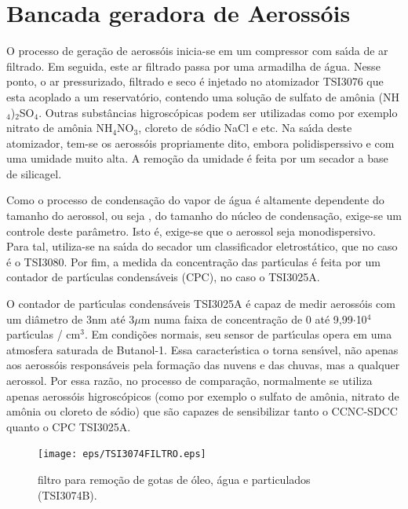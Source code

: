 \doublespacing
\chapter{Bancada geradora de Aeross\'{o}is}
\label{cap:bancada}

O processo de gera\c{c}\~{a}o de aeross\'{o}is inicia-se em um compressor com sa\'{\i}da de ar filtrado. Em seguida, este ar filtrado passa por uma armadilha de \'{a}gua. Nesse ponto, o ar pressurizado, filtrado e seco \'{e} injetado no atomizador TSI3076 que esta acoplado a um reservat\'{o}rio, contendo uma solu\c{c}\~{a}o de sulfato de am\^{o}nia (NH$_4$)$_2$SO$_4$. Outras subst\^{a}ncias higrosc\'{o}picas podem ser utilizadas como por exemplo nitrato de am\^{o}nia NH$_4$NO$_3$, cloreto de s\'{o}dio NaCl e etc. Na sa\'{\i}da deste atomizador, tem-se os aeross\'{o}is propriamente dito, embora polidisperssivo e com uma umidade muito alta. A remo\c{c}\~{a}o da umidade \'{e} feita por um secador a base de silicagel.

Como o processo de condensa\c{c}\~{a}o do vapor de \'{a}gua \'{e} altamente dependente do tamanho do aerossol, ou seja , do tamanho do n\'{u}cleo de condensa\c{c}\~{a}o, exige-se um controle deste par\^{a}metro. Isto \'{e}, exige-se que o aerossol seja monodispersivo. Para tal, utiliza-se na sa\'{\i}da do secador um classificador eletrost\'{a}tico, que no caso \'{e} o TSI3080. Por fim, a medida da concentra\c{c}\~{a}o das part\'{\i}culas \'{e} feita por um contador de part\'{\i}culas condens\'{a}veis (CPC), no caso o TSI3025A.

O contador de part\'{\i}culas condens\'{a}veis  TSI3025A \'{e} capaz de medir aeross\'{o}is com um di\^{a}metro de 3nm at\'{e} 3$\mu$m numa faixa de concentra\c{c}\~{a}o  de 0 at\'{e} 9,99$\cdot$10$^{4}$ part\'{\i}culas / cm$^{3}$. Em condi\c{c}\~{o}es normais, seu sensor de part\'{\i}culas opera em uma atmosfera saturada de Butanol-1.  Essa caracter\'{\i}stica o torna sens\'{\i}vel,  n\~{a}o apenas aos aeross\'{o}is respons\'{a}veis pela forma\c{c}\~{a}o das nuvens e das chuvas, mas a qualquer aerossol. Por essa raz\~{a}o, no processo de compara\c{c}\~{a}o, normalmente se utiliza apenas aeross\'{o}is higrosc\'{o}picos (como por exemplo o sulfato de am\^{o}nia, nitrato de am\^{o}nia ou cloreto de s\'{o}dio) que s\~{a}o capazes de sensibilizar tanto o CCNC-SDCC quanto o CPC TSI3025A.


\begin{figure}[hbt]
\begin{center}
\texttt{[image: eps/TSI3074FILTRO.eps]}\\
\end{center}
\caption{\label{TSI3074FILTRO}\hspace{-0.1em} filtro para remo\c{c}\~{a}o de gotas de \'{o}leo, \'{a}gua e particulados (TSI3074B). }
\end{figure}

